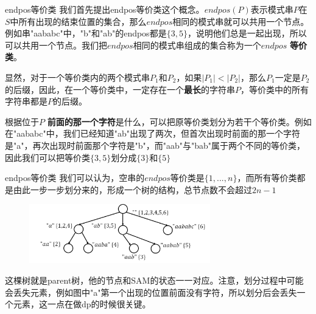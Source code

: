 \documentclass{beamer}
\begin{document}
\begin{frame}{endpos等价类}
    \small
    我们首先提出endpos等价类这个概念。$endpos(P)$表示模式串$P$在$S$中所有出现的结束位置的集合，那么$endpos$相同的模式串就可以共用一个节点。例如串"aababc"中，"b"和"ab"的endpos都是$\{3,5\}$，说明他们总是一起出现，所以可以共用一个节点。我们把$endpos$相同的模式串组成的集合称为一个$endpos$ \textbf{等价类}。

    \pause \vspace{1em}
    显然，对于一个等价类内的两个模式串$P_1$和$P_2$，如果$|P_1|<|P_2|$，那么$P_1$一定是$P_2$的后缀，因此，在一个等价类中，一定存在一个\textbf{最长}的字符串$P$，等价类中的所有字符串都是$P$的后缀。

    \pause \vspace{1em}
    根据位于$P$ \textbf{前面的那一个字符}是什么，可以把原等价类划分为若干个等价类。例如在"aababc"中，我们已经知道"ab"出现了两次，但首次出现时前面的那一个字符是"a"，再次出现时前面那个字符是"b"，而"aab"与"bab"属于两个不同的等价类，因此我们可以把等价类$\{3,5\}$划分成$\{3\}$和$\{5\}$
\end{frame}

\begin{frame}{endpos等价类}
    \small
    我们可以认为，空串的$endpos$等价类是$\{1,...,n\}$，而所有等价类都是由此一步一步划分来的，形成一个树的结构，总节点数不会超过$2n-1$

    \begin{figure}[H]
        \centering
        \includegraphics[width=0.7\textwidth]{pic/parent.png}
    \end{figure}

    这棵树就是parent树，他的节点和SAM的状态一一对应。注意，划分过程中可能会丢失元素，例如图中"a"第一个出现的位置前面没有字符，所以划分后会丢失一个元素，这一点在做dp的时候很关键。
\end{frame}
\end{document}
